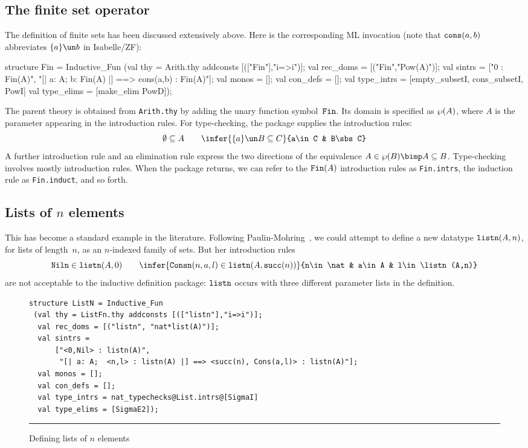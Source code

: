 \subsection{The finite set operator}
The definition of finite sets has been discussed extensively above.  Here
is the corresponding ML invocation (note that ${\tt cons}(a,b)$ abbreviates
$\{a\}\un b$ in Isabelle/ZF):
\begin{ttbox}
structure Fin = Inductive_Fun
 (val thy = Arith.thy addconsts [(["Fin"],"i=>i")];
  val rec_doms = [("Fin","Pow(A)")];
  val sintrs = 
          ["0 : Fin(A)",
           "[| a: A;  b: Fin(A) |] ==> cons(a,b) : Fin(A)"];
  val monos = [];
  val con_defs = [];
  val type_intrs = [empty_subsetI, cons_subsetI, PowI]
  val type_elims = [make_elim PowD]);
\end{ttbox}
The parent theory is obtained from {\tt Arith.thy} by adding the unary
function symbol~${\tt Fin}$.  Its domain is specified as $\wp(A)$, where $A$ is
the parameter appearing in the introduction rules.  For type-checking, the
package supplies the introduction rules:
\[ \emptyset\sbs A              \qquad
   \infer{\{a\}\un B\sbs C}{a\in C & B\sbs C}
\]
A further introduction rule and an elimination rule express the two
directions of the equivalence $A\in\pow(B)\bimp A\sbs B$.  Type-checking
involves mostly introduction rules.  When the package returns, we can refer
to the ${\tt Fin}(A)$ introduction rules as {\tt Fin.intrs}, the induction rule
as {\tt Fin.induct}, and so forth.

\subsection{Lists of $n$ elements}\label{listn-sec}
This has become a standard example in the
literature.  Following Paulin-Mohring~\cite{paulin92}, we could attempt to
define a new datatype ${\tt listn}(A,n)$, for lists of length~$n$, as an $n$-indexed
family of sets.  But her introduction rules
\[ {\tt Niln}\in\listn(A,0)  \qquad
   \infer{{\tt Consn}(n,a,l)\in\listn(A,\succ(n))}
         {n\in\nat & a\in A & l\in\listn(A,n)}
\]
are not acceptable to the inductive definition package:
${\tt listn}$ occurs with three different parameter lists in the definition.

\begin{figure}
\begin{small}
\begin{verbatim}
structure ListN = Inductive_Fun
 (val thy = ListFn.thy addconsts [(["listn"],"i=>i")];
  val rec_doms = [("listn", "nat*list(A)")];
  val sintrs = 
      ["<0,Nil> : listn(A)",
       "[| a: A;  <n,l> : listn(A) |] ==> <succ(n), Cons(a,l)> : listn(A)"];
  val monos = [];
  val con_defs = [];
  val type_intrs = nat_typechecks@List.intrs@[SigmaI]
  val type_elims = [SigmaE2]);
\end{verbatim}
\end{small}
\hrule
\caption{Defining lists of $n$ elements} \label{listn-fig}
\end{figure} 


